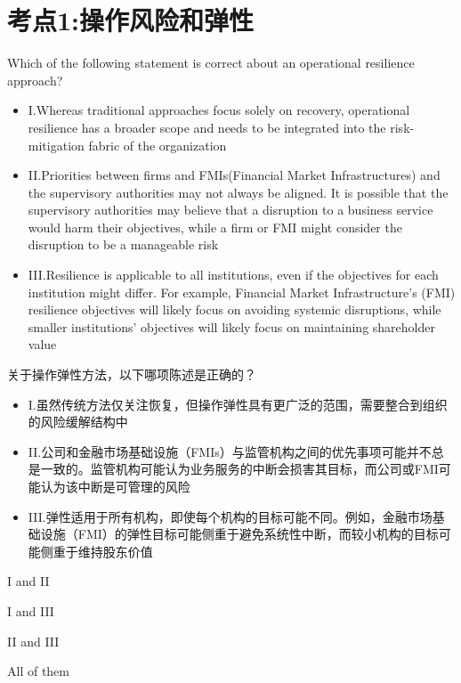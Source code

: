 \documentclass{article}
\newcounter{question} %
\begin{document}
 \tableofcontents %
\newpage




\section{考点1:操作风险和弹性}
\setcounter{question}{0}

\begin{question}
    Which of the following statement is correct about an operational resilience approach?
    \begin{itemize}
        \item I.Whereas traditional approaches focus solely on recovery, operational resilience has a broader scope and needs to be integrated into the risk-mitigation fabric of the organization
        \item II.Priorities between firms and FMIs(Financial Market Infrastructures) and the supervisory authorities may not always be aligned. It is possible that the supervisory authorities may believe that a disruption to a business service would harm their objectives, while a firm or FMI might consider the disruption to be a manageable risk
        \item III.Resilience is applicable to all institutions, even if the objectives for each institution might differ. For example, Financial Market Infrastructure's (FMI) resilience objectives will likely focus on avoiding systemic disruptions, while smaller institutions' objectives will likely focus on maintaining shareholder value
    \end{itemize}   
    关于操作弹性方法，以下哪项陈述是正确的？
    \begin{itemize}
        \item I.虽然传统方法仅关注恢复，但操作弹性具有更广泛的范围，需要整合到组织的风险缓解结构中
        \item II.公司和金融市场基础设施（FMIs）与监管机构之间的优先事项可能并不总是一致的。监管机构可能认为业务服务的中断会损害其目标，而公司或FMI可能认为该中断是可管理的风险
        \item III.弹性适用于所有机构，即使每个机构的目标可能不同。例如，金融市场基础设施（FMI）的弹性目标可能侧重于避免系统性中断，而较小机构的目标可能侧重于维持股东价值
    \end{itemize}
    
\end{question}

\begin{choices}
    \item I and II
    \item I and III
    \item II and III
    \item All of them
\end{choices}
\end{document}
